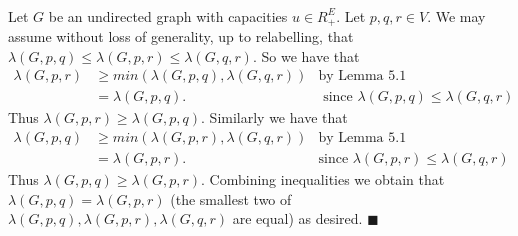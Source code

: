 \documentclass[letterpaper,12pt,oneside,onecolumn]{article}
\begin{document}
\paragraph{}
Let $G$ be an undirected graph with capacities $u \in R_+^E$. Let $p,q,r \in V$. We may assume without loss of generality, up to relabelling, that $\lambda(G,p,q) \leq \lambda(G,p,r) \leq \lambda(G,q,r)$. So we have that 
\begin{align*}
\lambda(G,p,r) &\geq min(\lambda(G,p,q), \lambda(G,q,r)) &\text{by Lemma $5.1$}\\
&= \lambda(G,p,q). &\text{ since $\lambda(G,p,q) \leq \lambda(G,q,r)$}
\end{align*} 
Thus $\lambda(G,p,r) \geq \lambda(G,p,q)$. Similarly we have that
\begin{align*}
\lambda(G,p,q) &\geq min(\lambda(G,p,r), \lambda(G,q,r)) &\text{by Lemma $5.1$}\\
&= \lambda(G,p,r). &\text{since $\lambda(G,p,r) \leq \lambda(G,q,r)$}
\end{align*}
Thus $\lambda(G,p,q) \geq \lambda(G,p,r)$. Combining inequalities we obtain that $\lambda(G,p,q) = \lambda(G,p,r)$ (the smallest two of $\lambda(G,p,q),\lambda(G,p,r),\lambda(G,q,r)$ are equal) as desired. $\blacksquare$
\end{document}
